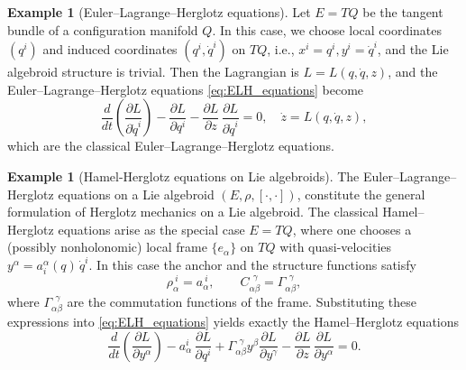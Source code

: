 \documentclass[11pt,a4paper]{article}
\theoremstyle{definition}
\newtheorem{example}[theorem]{Example}
\begin{document}

\begin{example}[Euler--Lagrange--Herglotz equations]

Let $E=TQ$ be the tangent bundle of a configuration manifold $Q$.
In this case, we choose local coordinates $(q^i)$ and induced coordinates
$(q^i,\dot q^i)$ on $TQ$, i.e., $x^i = q^i, y^i = \dot q^i$, and the Lie algebroid structure is trivial. Then the Lagrangian is $L=L(q,\dot q,z)$, and the Euler--Lagrange--Herglotz equations \eqref{eq:ELH_equations} become
\[
\frac{d}{dt}\left(\frac{\partial L}{\partial \dot q^i}\right)
- \frac{\partial L}{\partial q^i}
- \frac{\partial L}{\partial z}\,\frac{\partial L}{\partial \dot q^i}
= 0, \quad \dot z = L(q,\dot q,z),
\]
which are the classical Euler--Lagrange--Herglotz equations.
\end{example}

\begin{example}[Hamel-Herglotz equations on Lie algebroids]
The Euler--Lagrange--Herglotz equations on a Lie algebroid 
$(E,\rho,[\cdot,\cdot])$, constitute the general formulation of Herglotz mechanics on a Lie algebroid. The classical Hamel--Herglotz equations arise as the special case 
$E=TQ$, where one chooses a (possibly nonholonomic) local frame 
$\{e_\alpha\}$ on $TQ$ with quasi-velocities 
$y^\alpha = a_i^\alpha(q)\,\dot q^i$.
In this case the anchor and the structure functions satisfy
\[
\rho_\alpha^{\ i}=a_\alpha^{\ i}, \qquad 
C_{\alpha\beta}^{\ \ \gamma}=\Gamma_{\alpha\beta}^{\ \ \gamma},
\]
where $\Gamma_{\alpha\beta}^{\ \ \gamma}$ are the commutation functions 
of the frame.
Substituting these expressions into 
\eqref{eq:ELH_equations} yields exactly the
Hamel--Herglotz equations
\begin{equation}
\frac{d}{dt}\!\left(\frac{\partial L}{\partial y^\alpha}\right)
- a_\alpha^i\,\frac{\partial L}{\partial q^i}
+ \Gamma_{\alpha\beta}^{\ \ \gamma} y^\beta 
\frac{\partial L}{\partial y^\gamma}
- \frac{\partial L}{\partial z}\,\frac{\partial L}{\partial y^\alpha}=0.
\end{equation}

\end{example}
\end{document}
